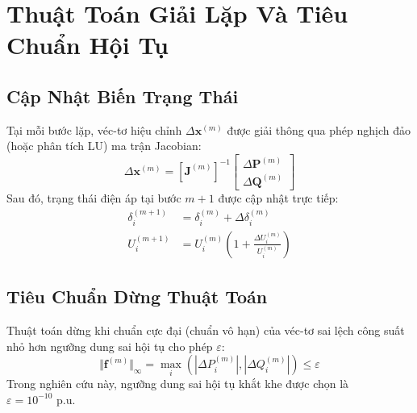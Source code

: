\documentclass[12pt,a4paper,oneside]{report}
\begin{document}
\section{Thuật Toán Giải Lặp Và Tiêu Chuẩn Hội Tụ}

\subsection{Cập Nhật Biến Trạng Thái}
Tại mỗi bước lặp, véc-tơ hiệu chỉnh $\Delta \mathbf{x}^{(m)}$ được giải thông qua phép nghịch đảo (hoặc phân tích LU) ma trận Jacobian:
\begin{equation}
\Delta \mathbf{x}^{(m)} = \left[ \mathbf{J}^{(m)} \right]^{-1}
\begin{bmatrix}
\Delta \mathbf{P}^{(m)} \\
\Delta \mathbf{Q}^{(m)}
\end{bmatrix}
\end{equation}
Sau đó, trạng thái điện áp tại bước $m+1$ được cập nhật trực tiếp:
\begin{align}
\delta_i^{(m+1)} &= \delta_i^{(m)} + \Delta \delta_i^{(m)} \\
U_i^{(m+1)} &= U_i^{(m)} \left( 1 + \frac{\Delta U_i^{(m)}}{U_i^{(m)}} \right)
\end{align}

\subsection{Tiêu Chuẩn Dừng Thuật Toán}
Thuật toán dừng khi chuẩn cực đại (chuẩn vô hạn) của véc-tơ sai lệch công suất nhỏ hơn ngưỡng dung sai hội tụ cho phép $\varepsilon$:
\begin{equation}
\Vert \mathbf{f}^{(m)} \Vert_\infty = \max_{i} \left( |\Delta P_i^{(m)}|, |\Delta Q_i^{(m)}| \right) \le \varepsilon
\end{equation}
Trong nghiên cứu này, ngưỡng dung sai hội tụ khắt khe được chọn là $\varepsilon = 10^{-10}\text{ p.u.}$
\end{document}
